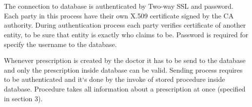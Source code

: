 \chapter {}
The connection to database is authenticated by Two-way SSL and password. Each party in this process have their own X.509 certificate signed by the CA authority. During authentication process each party verifies certificate of another entity, to be sure that entity is exactly who claims to be. Password is required for specify the username to the database.

Whenever prescription is created by the doctor it has to be send to the database and only the prescription inside database can be valid. Sending process requires to be authenticated and it`s done by the invoke of stored procedure inside database. Procedure takes all information about a prescription at once (specified in section 3).

